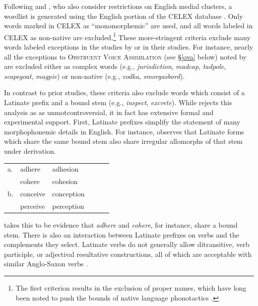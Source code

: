 Following \citet[ chap.~8]{Duanmu2009} and \citet[ chap.~3]{Hammond1999a}, who also consider restrictions on English medial clusters, a wordlist is generated using the English portion of the CELEX database \citep{CELEX}.
Only words marked in CELEX as ``monomorphemic'' are used, and all words labeled in CELEX as non-native are excluded.\footnote{
    The first criterion results in the exclusion of proper names, which have long been noted to push the bounds of native language phonotactics \citep[e.g.,][254]{Trubetzkoy1939}.}
These more-stringent criteria exclude many words labeled exceptions in the studies by \citeauthor{Duanmu2009} or \citeauthor{Hammond1999a} in their studies.
For instance, nearly all the exceptions to \textsc{Obstruent Voice Assimilation} (see \S\ref{ova} below) noted by \citet[74]{Hammond1999a} are excluded either as complex words (e.g., \emph{jurisdiction}, \emph{madcap}, \emph{tadpole}, \emph{scapegoat}, \emph{magpie}) or non-native (e.g., \emph{vodka}, \emph{smorgasbord}).

In contrast to prior studies, these criteria also exclude words which consist of a Latinate prefix and a bound stem (e.g., \emph{inspect}, \emph{excrete}). 
While \citeauthor{Pierrehumbert1994} rejects this analysis as as unmotcontroversial, it in fact has extensive formal and experimental support.
First, Latinate prefixes simplify the statement of many morphophonemic details in English.
For instance, \citet[11f.]{Aronoff1976} observes that Latinate forms which share the same bound stem also share irregular allomorphs of that stem under derivation. 

\begin{example}
\begin{tabular}{l l l l l l}
a. & {adhere}   & {adhesion}   \\
   & {cohere}   & {cohesion}   \\
b. & {conceive} & {conception} \\
   & {perceive} & {perception} \\
\end{tabular}
\end{example}

\noindent
\citeauthor{Aronoff1976} takes this to be evidence that \emph{adhere} and \emph{cohere}, for instance, share a bound stem.
There is also an interaction between Latinate prefixes on verbs and the complements they select.
Latinate verbs do not generally allow ditransitive, verb participle, or adjectival resultative constructions, all of which are acceptable with similar Anglo-Saxon verbs \citep[e.g.,][]{Gropen1989,Harley2009}.

